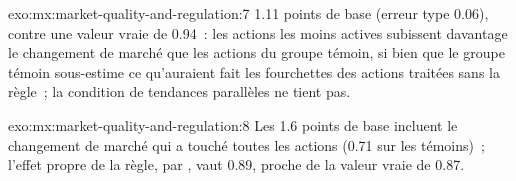 \begin{solution}{exo:mx:market-quality-and-regulation:7}
1.11 points de base (erreur type 0.06), contre une valeur vraie de 0.94~: les actions les moins actives subissent davantage le changement de marché que les actions du groupe témoin,
si bien que le groupe témoin sous-estime ce qu'auraient fait les fourchettes des actions traitées sans la règle~; la condition de tendances parallèles ne tient pas.
\end{solution}

\begin{solution}{exo:mx:market-quality-and-regulation:8}
Les 1.6 points de base incluent le changement de marché qui a touché toutes les actions (0.71 sur les témoins)~; l'effet propre de la règle, par ,
vaut 0.89, proche de la valeur vraie de 0.87.
\end{solution}

